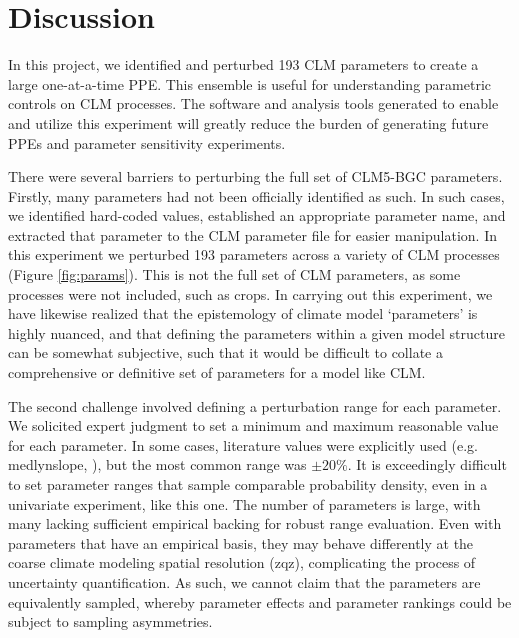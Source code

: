 \documentclass[draft]{agujournal2019}
\begin{document}
\section{Discussion}

In this project, we identified and perturbed 193 CLM parameters to create a large one-at-a-time PPE. This ensemble is useful for understanding parametric controls on CLM processes. The software and analysis tools generated to enable and utilize this experiment will greatly reduce the burden of generating future PPEs and parameter sensitivity experiments.

There were several barriers to perturbing the full set of CLM5-BGC parameters. Firstly, many parameters had not been officially identified as such. In such cases, we identified hard-coded values, established an appropriate parameter name, and extracted that parameter to the CLM parameter file for easier manipulation. In this experiment we perturbed 193 parameters across a variety of CLM processes (Figure \ref{fig:params}). This is not the full set of CLM parameters, as some processes were not included, such as crops. In carrying out this experiment, we have likewise realized that the epistemology of climate model `parameters' is highly nuanced, and that defining the parameters within a given model structure can be somewhat subjective, such that it would be difficult to collate a comprehensive or definitive set of parameters for a model like CLM.

The second challenge involved defining a perturbation range for each parameter. We solicited expert judgment to set a minimum and maximum reasonable value for each parameter. In some cases, literature values were explicitly used (e.g. medlynslope, ), but the most common range was $\pm20\%$. It is exceedingly difficult to set parameter ranges that sample comparable probability density, even in a univariate experiment, like this one. The number of parameters is large, with many lacking sufficient empirical backing for robust range evaluation. Even with parameters that have an empirical basis, they may behave differently at the coarse climate modeling spatial resolution (zqz), complicating the process of uncertainty quantification. As such, we cannot claim that the parameters are equivalently sampled, whereby parameter effects and parameter rankings could be subject to sampling asymmetries.
\end{document}
